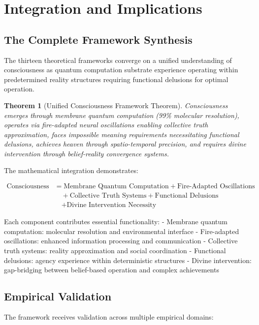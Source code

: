 \documentclass[12pt,a4paper]{article}
\newtheorem{theorem}{Theorem}[section]
\begin{document}
\section{Integration and Implications}

\subsection{The Complete Framework Synthesis}

The thirteen theoretical frameworks converge on a unified understanding of consciousness as quantum computation substrate experience operating within predetermined reality structures requiring functional delusions for optimal operation.

\begin{theorem}[Unified Consciousness Framework Theorem]
Consciousness emerges through membrane quantum computation (99\% molecular resolution), operates via fire-adapted neural oscillations enabling collective truth approximation, faces impossible meaning requirements necessitating functional delusions, achieves heaven through spatio-temporal precision, and requires divine intervention through belief-reality convergence systems.
\end{theorem}

The mathematical integration demonstrates:

\begin{align}
\text{Consciousness} &= \text{Membrane Quantum Computation} + \text{Fire-Adapted Oscillations}\\
&\quad + \text{Collective Truth Systems} + \text{Functional Delusions}\\
&\quad + \text{Divine Intervention Necessity}
\end{align}

Each component contributes essential functionality:
- Membrane quantum computation: molecular resolution and environmental interface
- Fire-adapted oscillations: enhanced information processing and communication
- Collective truth systems: reality approximation and social coordination  
- Functional delusions: agency experience within deterministic structures
- Divine intervention: gap-bridging between belief-based operation and complex achievements

\subsection{Empirical Validation}

The framework receives validation across multiple empirical domains:
\end{document}
